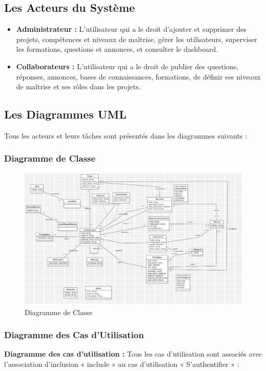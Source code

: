 \documentclass{article}
\begin{document}
        \subsection{Les Acteurs du Système}  
            \begin{itemize}
                \item \textbf{Administrateur :} L'utilisateur qui a le droit d'ajouter et supprimer des projets, compétences et niveaux de maîtrise, gérer les utilisateurs, superviser les formations, questions et annonces, et consulter le dashboard.
                \item \textbf{Collaborateurs :} L'utilisateur qui a le droit de publier des questions, réponses, annonces, bases de connaissances, formations, de définir ses niveaux de maîtrise et ses rôles dans les projets.
            \end{itemize}
        \subsection{Les Diagrammes UML}
            Tous les acteurs et leurs tâches sont présentés dans les diagrammes suivants :
            
            \subsubsection{Diagramme de Classe}
                \begin{figure}[h!]
                    \centering
                    \includegraphics[width=1.0\textwidth]{assets/diagrammes/class.jpg}
                    \caption{Diagramme de Classe}
                \end{figure}
                \FloatBarrier 
            \newpage
            \subsubsection{Diagramme des Cas d'Utilisation}
                \textbf{Diagramme des cas d'utilisation :} Tous les cas d'utilisation sont associés avec l'association d'inclusion « include » au cas d'utilisation « S'authentifier » :
                
\end{document}
